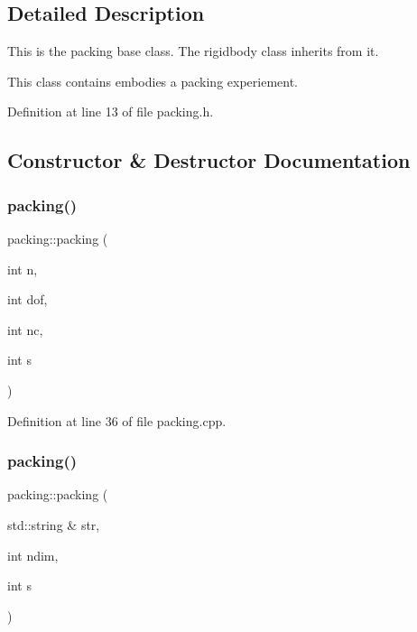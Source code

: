 \subsection{Detailed Description}
This is the packing base class. The rigidbody class inherits from it. 

This class contains embodies a packing experiement. 

Definition at line 13 of file packing.\+h.



\subsection{Constructor \& Destructor Documentation}
\mbox{\label{classpacking_aec1b63190de5c8e69e47a06bfb7db0d5}} 
\subsubsection{\texorpdfstring{packing()}{packing()}\hspace{0.1cm}{\footnotesize\ttfamily [1/4]}}
{\footnotesize\ttfamily packing\+::packing (\begin{DoxyParamCaption}\item[{int}]{n,  }\item[{int}]{dof,  }\item[{int}]{nc,  }\item[{int}]{s }\end{DoxyParamCaption})}



Definition at line 36 of file packing.\+cpp.

\mbox{\label{classpacking_ac345d2c7345a103d7b390585565d2712}} 
\subsubsection{\texorpdfstring{packing()}{packing()}\hspace{0.1cm}{\footnotesize\ttfamily [2/4]}}
{\footnotesize\ttfamily packing\+::packing (\begin{DoxyParamCaption}\item[{std\+::string \&}]{str,  }\item[{int}]{ndim,  }\item[{int}]{s }\end{DoxyParamCaption})}

